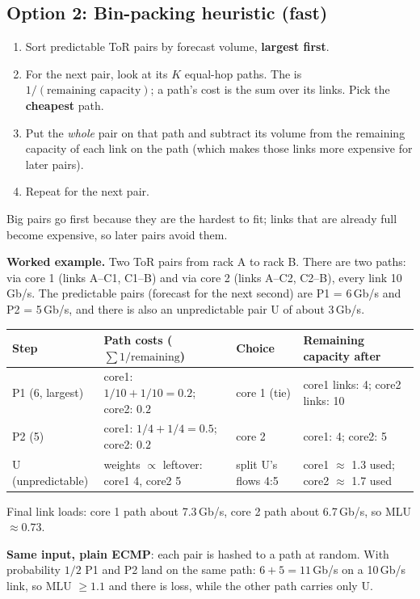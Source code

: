 \subsection{Option 2: Bin-packing heuristic (fast)}
\begin{enumerate}
  \item Sort predictable ToR pairs by forecast volume, \textbf{largest first}.
  \item For the next pair, look at its $K$ equal-hop paths. The  is $1/(\text{remaining capacity})$; a path's cost is the
        sum over its links. Pick the \textbf{cheapest} path.
  \item Put the \emph{whole} pair on that path and subtract its volume from the remaining capacity of each link on the path (which makes those
        links more expensive for later pairs).
  \item Repeat for the next pair.
\end{enumerate}
Big pairs go first because they are the hardest to fit; links that are already full become expensive, so later pairs avoid them.

\textbf{Worked example.} Two ToR pairs from rack A to rack B. There are two paths: via core 1 (links A--C1, C1--B) and via core 2
(links A--C2, C2--B), every link 10\,Gb/s. The predictable pairs (forecast for the next second) are P1 = 6\,Gb/s and P2 = 5\,Gb/s,
and there is also an unpredictable pair U of about 3\,Gb/s.
\begin{center}
\small
\begin{tabular}{@{}llll@{}}
\toprule
Step & Path costs ($\sum 1/\text{remaining}$) & Choice & Remaining capacity after\\
\midrule
P1 (6, largest) & core1: $1/10+1/10 = 0.2$; core2: $0.2$ & core 1 (tie) & core1 links: 4; core2 links: 10\\
P2 (5) & core1: $1/4+1/4 = 0.5$; core2: $0.2$ & core 2 & core1: 4; core2: 5\\
U (unpredictable) & weights $\propto$ leftover: core1 4, core2 5 & split U's flows 4:5 & core1 $\approx$ 1.3 used; core2 $\approx$ 1.7 used\\
\bottomrule
\end{tabular}
\end{center}
Final link loads: core 1 path about 7.3\,Gb/s, core 2 path about 6.7\,Gb/s, so MLU $\approx 0.73$.

\textbf{Same input, plain ECMP}: each pair is hashed to a path at random. With probability $1/2$ P1 and P2 land on the same path:
$6+5 = 11$\,Gb/s on a 10\,Gb/s link, so MLU $\ge 1.1$ and there is loss, while the other path carries only U.

